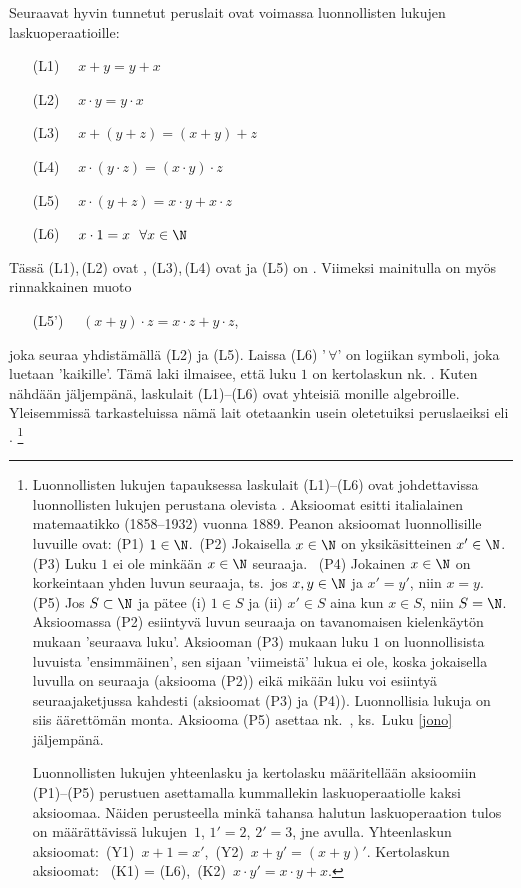 Seuraavat hyvin tunnetut peruslait ovat voimassa luonnollisten lukujen laskuoperaatioille:
\begin{itemize}
\item[(L1)] $\quad x+y = y+x$
\item[(L2)] $\quad x \cdot y = y \cdot x$
\item[(L3)] $\quad x+(y+z) = (x+y)+z$
\item[(L4)] $\quad x \cdot (y \cdot z) = (x \cdot y) \cdot z$
\item[(L5)] $\quad x \cdot (y+z) = x \cdot y + x \cdot z$
\item[(L6)] $\quad x \cdot 1 = x \ \ \forall x \in \N$
\end{itemize}
Tässä (L1),\,(L2) ovat , (L3),\,(L4) ovat  ja (L5) on 
. Viimeksi mainitulla on myös rinnakkainen muoto
\begin{itemize}
\item[(L5')] $\quad\!\! (x+y) \cdot z = x \cdot z + y \cdot z$,
\end{itemize}
joka seuraa yhdistämällä (L2) ja (L5). Laissa (L6) '$\,\forall$' on logiikan symboli, joka 
luetaan 'kaikille'. Tämä laki ilmaisee, että luku  $1$ on kertolaskun nk. . 
Kuten nähdään jäljempänä, laskulait (L1)--(L6) ovat yhteisiä monille algebroille. Yleisemmissä
tarkasteluissa nämä lait otetaankin usein oletetuiksi peruslaeiksi eli
%
. %
\footnote[2]{Luonnollisten lukujen tapauksessa laskulait (L1)--(L6) ovat
johdettavissa luonnollisten lukujen perustana olevista . Aksioomat
esitti italialainen matemaatikko  (1858--1932) vuonna 1889. Peanon
aksioomat luonnollisille luvuille ovat: (P1) $1\in\N$. \,(P2) Jokaisella $x\in\N$ on
yksikäsitteinen  $x'\in\N$. \,(P3) Luku $1$ ei ole minkään $x\in\N$ seuraaja. \,
(P4) Jokainen $x\in\N$ on korkeintaan yhden luvun seuraaja, ts.\ jos $x,y\in\N$ ja $x'=y'$, niin
$x=y$. \,(P5) Jos $S\subset\N$ ja pätee (i) $1\in S$ ja (ii) $x' \in S$ aina kun $x \in S$,
niin $S=\N$. Aksioomassa (P2) esiintyvä luvun seuraaja on tavanomaisen kielenkäytön mukaan
'seuraava luku'. Aksiooman (P3) mukaan luku $1$ on luonnollisista luvuista 'ensimmäinen', sen
sijaan 'viimeistä' lukua ei ole, koska jokaisella luvulla on seuraaja (aksiooma (P2)) eikä 
mikään luku voi esiintyä seuraajaketjussa kahdesti (aksioomat (P3) ja (P4)). Luonnollisia lukuja
on siis äärettömän monta. Aksiooma (P5) asettaa nk.\ , ks.\ Luku
\ref{jono} jäljempänä. 

Luonnollisten lukujen yhteenlasku ja kertolasku määritellään aksioomiin (P1)--(P5) perustuen
asettamalla kummallekin laskuoperaatiolle kaksi aksioomaa. Näiden perusteella minkä tahansa
halutun laskuoperaation tulos on määrättävissä lukujen $\,1$, $1' = 2$, $2' = 3$, jne avulla.
Yhteenlaskun aksioomat: \,(Y1) $\,x+1=x'$, \,(Y2) $\,x+y'=(x+y)'$. Kertolaskun aksioomat: \,
(K1) = (L6), \,(K2) $\,x \cdot y' = x \cdot y + x$.}

